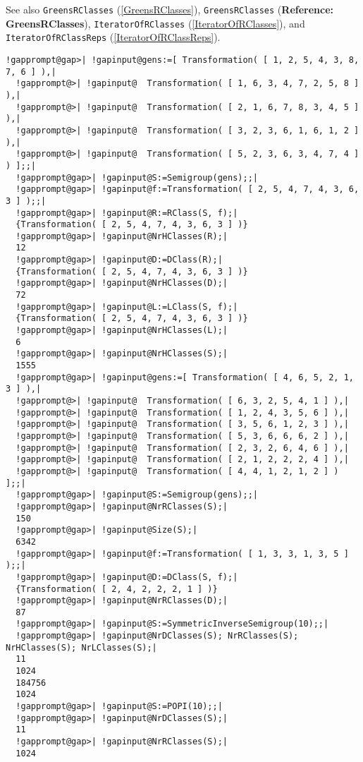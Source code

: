 \documentclass[a4paper,11pt]{report}
\begin{document}
{{{ See also \texttt{GreensRClasses} (\ref{GreensRClasses}), \texttt{GreensRClasses} (\textbf{Reference: GreensRClasses}), \texttt{IteratorOfRClasses} (\ref{IteratorOfRClasses}), and \texttt{IteratorOfRClassReps} (\ref{IteratorOfRClassReps}). 
\begin{Verbatim}[commandchars=!@|,fontsize=\small,frame=single,label=Example]
  !gapprompt@gap>| !gapinput@gens:=[ Transformation( [ 1, 2, 5, 4, 3, 8, 7, 6 ] ),|
  !gapprompt@>| !gapinput@  Transformation( [ 1, 6, 3, 4, 7, 2, 5, 8 ] ),|
  !gapprompt@>| !gapinput@  Transformation( [ 2, 1, 6, 7, 8, 3, 4, 5 ] ),|
  !gapprompt@>| !gapinput@  Transformation( [ 3, 2, 3, 6, 1, 6, 1, 2 ] ),|
  !gapprompt@>| !gapinput@  Transformation( [ 5, 2, 3, 6, 3, 4, 7, 4 ] ) ];;|
  !gapprompt@gap>| !gapinput@S:=Semigroup(gens);;|
  !gapprompt@gap>| !gapinput@f:=Transformation( [ 2, 5, 4, 7, 4, 3, 6, 3 ] );;|
  !gapprompt@gap>| !gapinput@R:=RClass(S, f);|
  {Transformation( [ 2, 5, 4, 7, 4, 3, 6, 3 ] )}
  !gapprompt@gap>| !gapinput@NrHClasses(R);|
  12
  !gapprompt@gap>| !gapinput@D:=DClass(R);|
  {Transformation( [ 2, 5, 4, 7, 4, 3, 6, 3 ] )}
  !gapprompt@gap>| !gapinput@NrHClasses(D);|
  72
  !gapprompt@gap>| !gapinput@L:=LClass(S, f);|
  {Transformation( [ 2, 5, 4, 7, 4, 3, 6, 3 ] )}
  !gapprompt@gap>| !gapinput@NrHClasses(L);|
  6
  !gapprompt@gap>| !gapinput@NrHClasses(S);|
  1555
  !gapprompt@gap>| !gapinput@gens:=[ Transformation( [ 4, 6, 5, 2, 1, 3 ] ),|
  !gapprompt@>| !gapinput@  Transformation( [ 6, 3, 2, 5, 4, 1 ] ),|
  !gapprompt@>| !gapinput@  Transformation( [ 1, 2, 4, 3, 5, 6 ] ),|
  !gapprompt@>| !gapinput@  Transformation( [ 3, 5, 6, 1, 2, 3 ] ),|
  !gapprompt@>| !gapinput@  Transformation( [ 5, 3, 6, 6, 6, 2 ] ),|
  !gapprompt@>| !gapinput@  Transformation( [ 2, 3, 2, 6, 4, 6 ] ),|
  !gapprompt@>| !gapinput@  Transformation( [ 2, 1, 2, 2, 2, 4 ] ),|
  !gapprompt@>| !gapinput@  Transformation( [ 4, 4, 1, 2, 1, 2 ] ) ];;|
  !gapprompt@gap>| !gapinput@S:=Semigroup(gens);;|
  !gapprompt@gap>| !gapinput@NrRClasses(S);|
  150
  !gapprompt@gap>| !gapinput@Size(S);|
  6342
  !gapprompt@gap>| !gapinput@f:=Transformation( [ 1, 3, 3, 1, 3, 5 ] );;|
  !gapprompt@gap>| !gapinput@D:=DClass(S, f);|
  {Transformation( [ 2, 4, 2, 2, 2, 1 ] )}
  !gapprompt@gap>| !gapinput@NrRClasses(D);|
  87
  !gapprompt@gap>| !gapinput@S:=SymmetricInverseSemigroup(10);;|
  !gapprompt@gap>| !gapinput@NrDClasses(S); NrRClasses(S); NrHClasses(S); NrLClasses(S);|
  11
  1024
  184756
  1024
  !gapprompt@gap>| !gapinput@S:=POPI(10);;|
  !gapprompt@gap>| !gapinput@NrDClasses(S);|
  11
  !gapprompt@gap>| !gapinput@NrRClasses(S);|
  1024
\end{Verbatim}
 }

}}
\end{document}
